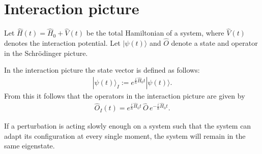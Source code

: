 \section{Interaction picture}\label{section:interaction_picture}

    Let $\hat{H}(t)=\hat{H}_0+\hat{V}(t)$ be the total Hamiltonian of a system, where $\hat{V}(t)$ denotes the interaction potential. Let $|\psi(t)\rangle$ and $\hat{O}$ denote a state and operator in the Schr\"odinger picture.
    \begin{definition}
        In the interaction picture the state vector is defined as follows:
        \begin{gather}
            |\psi(t)\rangle_I := e^{\frac{i}{\hbar}\hat{H}_0t}|\psi(t)\rangle.
        \end{gather}
        From this it follows that the operators in the interaction picture are given by
        \begin{gather}
            \hat{O}_I(t) = e^{\frac{i}{\hbar}\hat{H}_0t}\,\hat{O}\,e^{-\frac{i}{\hbar}\hat{H}_0t}.
        \end{gather}
    \end{definition}

    \begin{theorem}
        If a perturbation is acting slowly enough on a system such that the system can adapt its configuration at every single moment, the system will remain in the same eigenstate.
    \end{theorem}

